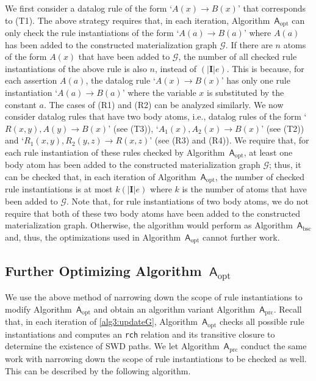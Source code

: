 We first consider a datalog rule of the
form `$A(x)\rightarrow B(x)$' that corresponds to (T1). The above strategy requires that,
in each iteration, Algorithm~$\mathsf{A}_{\text{opt}}$ can only check the rule instantiations
of the form `$A(a)\rightarrow B(a)$' where $A(a)$ has been added to the constructed materialization
graph $\mathcal{G}$. If there are $n$ atoms of the form $A(x)$ that have been added to $\mathcal{G}$,
the number of all checked rule instantiations of the above rule is also $n$, instead of $(|\textbf{I}|e)$.
This is because, for each assertion $A(a)$,
the datalog rule `$A(x)\rightarrow B(x)$'
has only one rule instantiation `$A(a)\rightarrow B(a)$' where
the variable $x$ is substituted by the constant $a$.
The cases of (R1) and (R2) can be analyzed similarly.
We now consider datalog rules that have two body atoms, i.e.,
datalog rules of the form `$R(x,y),A(y)\rightarrow B(x)$' (see (T3)),
`$A_1(x),A_2(x)\rightarrow B(x)$' (see (T2)) and `$R_1(x,y),R_2(y,z)\rightarrow R(x,z)$' (see (R3) and (R4)).
We require that, for each rule instantiation of these rules checked by Algorithm~$\mathsf{A}_{\text{opt}}$,
at least one body atom has been added to the constructed materialization
graph $\mathcal{G}$; thus, it can be checked that, in each iteration of Algorithm~$\mathsf{A}_{\text{opt}}$,
the number of checked rule instantiations
is at most $k(|\textbf{I}|e)$ where $k$ is the number of atoms that have been
added to $\mathcal{G}$.
Note that, for rule instantiations of two body atoms,
we do not require that both of these two body atoms have been added to
the constructed materialization graph.
Otherwise, the algorithm would
perform as Algorithm~$\mathsf{A}_{\text{bsc}}$ and, thus, the
optimizations used in Algorithm~$\mathsf{A}_{\text{opt}}$ cannot further work.



\subsection{Further Optimizing Algorithm~$\mathsf{A}_{\text{opt}}$}


We use the above method of narrowing down the scope of rule instantiations to
modify Algorithm~$\mathsf{A}_{\text{opt}}$ and obtain an algorithm variant Algorithm~$\mathsf{A}_{\text{prc}}$.
Recall that,
in each iteration of \ref{alg3:updateG}, Algorithm~$\mathsf{A}_{\text{opt}}$
checks all possible rule instantiations and computes an \texttt{rch} relation
and its transitive closure to determine the existence of SWD paths.
We let Algorithm~$\mathsf{A}_{\text{prc}}$ conduct the same work with
narrowing down the scope of rule instantiations to be checked as well. This can be described
by the following algorithm.\\

